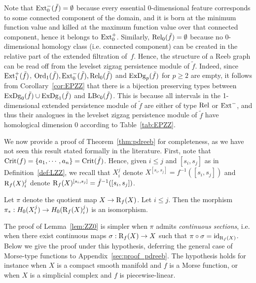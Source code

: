 Note that  $\Ext_0^-(\tilde f)%
= \emptyset$ because every
essential $0$-dimensional feature corresponds to some connected component of the
domain, and it is born at the minimum function value and killed at the
maximum function value over that connected component, hence it belongs to $\mathrm{Ext}_0^+$.
Similarly, $\mathrm{Rel}_0(\tilde f)=\emptyset$
because no 0-dimensional homology class (i.e. connected component) can be
created in the relative part of the extended filtration of~$f$. 
Hence, the structure of a Reeb graph can be read off from the levelset zigzag persistence module of $\tilde f$.
Indeed, since $\mathrm{Ext}_1^+(\tilde f)$, $\mathrm{Ord}_1(\tilde f),\mathrm{Ext}_0^-(\tilde f),\mathrm{Rel}_0(\tilde f)$ and $\mathrm{ExDg}_p(\tilde f)$ for $p\geq 2$ are empty, 
it follows from Corollary~\ref{cor:EPZZ} that 
there is a bijection preserving types between $\mathrm{ExDg}_0(\tilde f)\cup\mathrm{ExDg}_1(\tilde f)$ and $\mathrm{LBc}_0(\tilde f)$. 
This is because all intervals in the 1-dimensional extended persistence module of $\tilde f$ 
are either of type $\mathrm{Rel}$ or $\mathrm{Ext}^-$, and thus their analogues in the levelset zigzag persistence module of $\tilde f$ have 
homological dimension 0 according to Table~\ref{tab:EPZZ}.


We now provide a proof of Theorem~\ref{thm:pdreeb} for completeness, 
as we have not seen this result  stated formally in the literature. 
First, note that $\mathrm{Crit}(f)=\{a_1,\cdots,a_n\}=\mathrm{Crit}(\tilde f)$. 
Hence, given $i\leq j$ and $[s_i,s_j]$ as in Definition~\ref{def:LZZ}, %
we recall that $X_i^j$ denote $X^{[s_i,s_j]}=f^{-1}([s_i,s_j])$ and $\mathrm{R}_f(X)_i^j$ denote $\mathrm{R}_f(X)^{[s_i,s_j]}=\tilde f^{-1}([s_i,s_j])$.

\begin{lem}\label{lem:ZZ0}
Let $\pi$ denote the quotient map $X\rightarrow\mathrm{R}_f(X)$.
Let $i\leq j$.
Then the morphism $\pi_*:H_0(X_i^j)\rightarrow H_0(\mathrm{R}_f(X)_i^j)$ 
is an isomorphism.
\end{lem}

The proof of Lemma~\ref{lem:ZZ0} is
simpler when $\pi$ admits {\em continuous sections}, i.e. when there exist
continuous maps $\sigma:\mathrm{R}_f(X)\rightarrow X$ such that
$\pi\circ\sigma=\text{id}_{\mathrm{R}_f(X)}$.
Below we give the proof under this hypothesis, deferring 
the general case of Morse-type functions to
Appendix~\ref{sec:proof_pdreeb}.  The hypothesis holds for instance
when $X$ is a compact smooth manifold and $f$ is a Morse function, or
when $X$ is a simplicial complex and $f$ is piecewise-linear.

